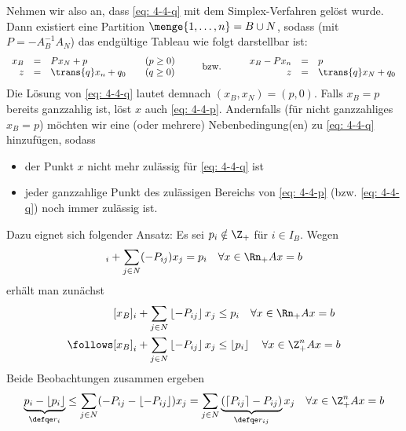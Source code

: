 Nehmen wir also an, dass \eqref{eq: 4-4-q} mit dem Simplex-Verfahren gelöst wurde. Dann existiert eine Partition $\menge{1, \dots, n} = B \cup N$, sodass (mit $P = -A_B^{-1} A_N$) das endgültige Tableau wie folgt darstellbar ist:
\begin{equation*}
	\begin{array}{rcll}
		x_B &=& Px_N + p \quad &(p \ge 0) \\
		z   &=& \trans{q} x_n + q_0  \quad &(q \ge 0)
	\end{array}
	\qquad \text{ bzw. } \qquad 
	\begin{array}{rcl}
		x_B - Px_n &=& p \\
		z &=& \trans{q} x_N + q_0
	\end{array}
\end{equation*}
Die Lösung von \eqref{eq: 4-4-q} lautet demnach $(x_B, x_N) = (p,0)$. Falls $x_B = p$ bereits ganzzahlig ist, löst $x$ auch \eqref{eq: 4-4-p}. Andernfalls (für nicht ganzzahliges $x_B = p$) möchten wir eine (oder mehrere) Nebenbedingung(en) zu \eqref{eq: 4-4-q} hinzufügen, sodass
\begin{itemize}[nolistsep, topsep=-\parskip]
	\item der Punkt $x$ nicht mehr zulässig für \eqref{eq: 4-4-q} ist
	\item jeder ganzzahlige Punkt des zulässigen Bereichs von \eqref{eq: 4-4-p} (bzw. \eqref{eq: 4-4-q}) noch immer zulässig ist.
\end{itemize}
Dazu eignet sich folgender Ansatz: Es sei $p_i \notin \Z_+$ für $i \in I_B$. Wegen
\begin{equation*}
	[x_B]_i + \sum_{j \in N} (-P_{ij}) x_j = p_i \quad \forall x \in \Rn_+ \mit Ax = b
\end{equation*}
erhält man zunächst 
\begin{equation*}
	\begin{aligned}
		[x_B]_i + \sum_{j \in N} \left\lfloor -P_{ij} \right\rfloor x_j &\le p_i \quad \forall x \in \Rn_+ \mit Ax = b \\
		\follows [x_B]_i + \sum_{j \in N} \left\lfloor -P_{ij} \right\rfloor x_j &\le \left\lfloor p_i \right\rfloor \quad \forall x \in \Z^n_+ \mit Ax = b
	\end{aligned}
\end{equation*}
Beide Beobachtungen zusammen ergeben
\begin{equation*}
	\underbrace{p_i - \left\lfloor p_i \right\rfloor}_{\defqe r_i} \le \sum_{j \in N} (-P_{ij} - \left\lfloor - P_{ij} \right\rfloor) x_j = \sum_{j \in N} \underbrace{(\left\lceil P_{ij} \right\rceil - P_{ij})}_{\defqe r_{ij}} x_j \quad \forall x \in \Z_+^n \mit Ax = b
\end{equation*}

